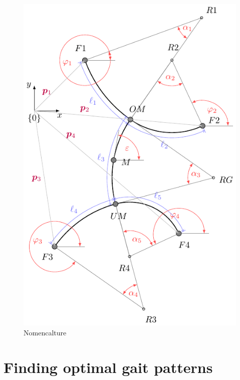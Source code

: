 \documentclass[letterpaper,10pt,conference]{ieeeconf}  %
\begin{document}
\begin{figure}
\centering\includegraphics[scale=1]{../Pics/model/model.pdf}
\caption{Nomencalture}
\label{fig:model}
\end{figure}


\section{Finding optimal gait patterns}

%
\end{document}
